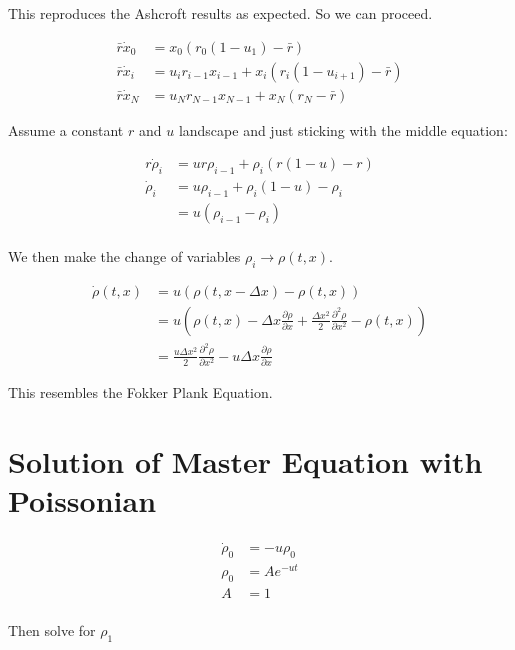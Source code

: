 \documentclass[a4paper]{article}
\begin{document}
This reproduces the Ashcroft results as expected. So we can proceed. 

\begin{align}
\bar{r} \dot{x} _0 & = x_0 \left( r_0  \left( 1- u_{1} \right) - \bar{r} \right) \\
\bar{r} \dot{x} _i & = u_i r_{i-1} x_{i-1} + x_i \left( r_i  \left( 1- u_{i+1} \right) - \bar{r} \right) \\
\bar{r} \dot{x} _N & = u_N r_{N-1} x_{N-1} + x_N \left( r_N   - \bar{r} \right)
\end{align}

Assume a constant $r$ and $u$ landscape and just sticking with the middle equation:

\begin{align*}
r \dot{\rho} _i & = u r \rho _{i-1} + \rho _i ( r(1- u) - r) \\
\dot{\rho} _i & = u \rho _{i-1} + \rho _i ( 1-u) - \rho _{i} \\
& = u  ( \rho _{i-1} -  \rho _{i} ) \\
\end{align*}

We then make the change of variables $\rho _i \rightarrow \rho(t, x) $. 

\begin{align*}
\dot{\rho} (t,x ) & = u \left( \rho (t, x - \Delta x) - \rho (t , x) \right) \\
& = u \left( \rho(t,x) - \Delta x \frac{\partial \rho}{\partial x} + \frac{\Delta x ^2}{2} \frac{\partial ^2 \rho}{\partial x ^2}   - \rho (t , x) \right) \\
& = \frac{u \Delta x ^2}{2} \frac{\partial ^2 \rho}{\partial x ^2} - u \Delta x \frac{\partial \rho}{\partial x}
\end{align*}

This resembles the Fokker Plank Equation. 

\section{Solution of Master Equation with Poissonian}

\begin{align*}
\dot{\rho}_0 & = - u \rho _0 \\
\rho _0 & = A e^{-u t} \\
A & = 1 \\
\end{align*}

Then solve for $\rho _1$
\end{document}
